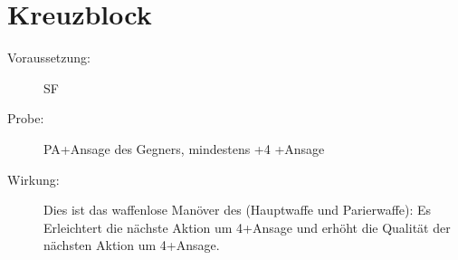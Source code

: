 \section{Kreuzblock}
\label{uPA.kreuzblock}
\begin{description}
    \item[Voraussetzung:]
        SF 
    \item[Probe:]
        PA+Ansage des Gegners, mindestens +4 +Ansage
    \item[Wirkung:]
        Dies ist das waffenlose Manöver des  (Hauptwaffe und Parierwaffe):
        Es Erleichtert die nächste Aktion um 4+Ansage und erhöht die Qualität der nächsten Aktion um 4+Ansage.
\end{description}

